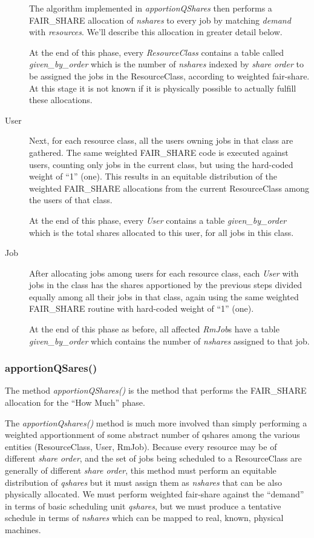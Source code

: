 \begin{description}
        The algorithm implemented in {\em apportionQShares} then performs a FAIR\_SHARE allocation of
        {\em nshares} to every job by matching {\em demand} with {\em resources}. We'll describe this allocation in greater detail below.

        At the end of this phase, every {\em ResourceClass} contains a table called {\em given\_by\_order} which is 
        the number of {\em nshares} indexed by {\em share order} to be assigned the jobs in the ResourceClass,
        according to weighted fair-share.  At this stage
        it is not known if it is physically possible to actually fulfill these allocations.

      \item[User] Next, for each resource class, all the users owning jobs in that class are
        gathered.  The same weighted FAIR\_SHARE code is executed against users, counting only jobs
        in the current class, but using the hard-coded weight of ``1'' (one).  This results in an
        equitable distribution of the weighted FAIR\_SHARE allocations from the current ResourceClass among
        the users of that class.

        At the end of this phase, every {\em User} contains a table {\em given\_by\_order} which is the total
        shares allocated to this user, for all jobs in this class.

      \item[Job] After allocating jobs among users for each resource class, each {\em User} with
        jobs in the class has the shares apportioned by the previous steps divided equally among all
        their jobs in that class, again using the same weighted FAIR\_SHARE routine with hard-coded
        weight of ``1'' (one).

        At the end of this phase as before, all affected {\em RmJob}s have a table {\em
          given\_by\_order} which contains the number of {\em nshares} assigned to that
        job.
    \end{description}

\subsubsection{apportionQSares()}    
    The method {\em apportionQShares()} is the method that performs the FAIR\_SHARE allocation for the
    ``How Much'' phase.

    The {\em apportionQshares()} method is much more involved than simply performing a weighted apportionment
    of some abstract number of qshares among the various entities (ResourceClass, User, RmJob).  Because
    every resource may be of different {\em share order}, and the set of jobs being scheduled to a ResourceClass
    are generally of  different {\em share order}, this method must perform an equitable distribution of {\em qshares} but it
    must assign them as {\em nshares} that can be also physically allocated.  We must perform weighted fair-share
    against the ``demand'' in terms of basic scheduling unit {\em qshares}, but we must produce a tentative schedule in terms of
    {\em nshares} which can be mapped to real, known, physical machines.

